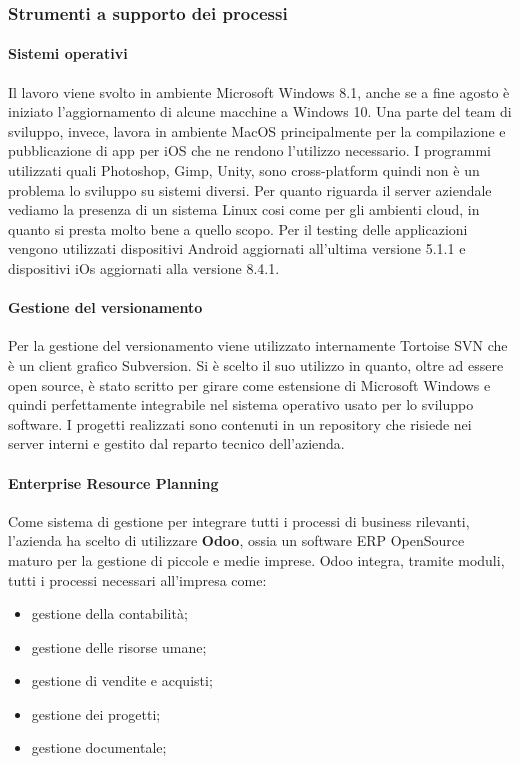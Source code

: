 \subsubsection{Strumenti a supporto dei processi}
\paragraph{Sistemi operativi}
Il lavoro viene svolto in ambiente Microsoft Windows 8.1, anche se a fine agosto \`e iniziato l'aggiornamento di alcune macchine a Windows 10. Una parte del team di sviluppo, invece, lavora in ambiente MacOS principalmente per la compilazione e pubblicazione di app per iOS che ne rendono l'utilizzo necessario. I programmi utilizzati quali Photoshop, Gimp, Unity, sono cross-platform quindi non \`e un problema lo sviluppo su sistemi diversi. 
Per quanto riguarda il server aziendale vediamo la presenza di un sistema Linux cosi come per gli ambienti cloud, in quanto si presta molto bene a quello scopo.
Per il testing delle applicazioni vengono utilizzati dispositivi Android aggiornati all'ultima versione 5.1.1 e dispositivi iOs aggiornati alla versione 8.4.1.

\paragraph{Gestione del versionamento}
Per la gestione del versionamento viene utilizzato internamente Tortoise SVN che \`e un client grafico Subversion. Si \`e scelto il suo utilizzo in quanto, oltre ad essere open source, \`e stato scritto per girare come estensione di Microsoft Windows e quindi perfettamente integrabile nel sistema operativo usato per lo sviluppo software.
I progetti realizzati sono contenuti in un repository che risiede nei server interni e gestito dal reparto tecnico dell'azienda.

\paragraph{Enterprise Resource Planning}
Come sistema di gestione per integrare tutti i processi di business rilevanti, l'azienda ha scelto di utilizzare \textbf{Odoo}, ossia un software ERP OpenSource maturo per la gestione di piccole e medie imprese. 
Odoo integra, tramite moduli, tutti i processi necessari all'impresa come:
\begin{itemize}
	\item gestione della contabilità;
	\item gestione delle risorse umane;
	\item gestione di vendite e acquisti;
	\item gestione dei progetti;
	\item gestione documentale;
\end{itemize}

